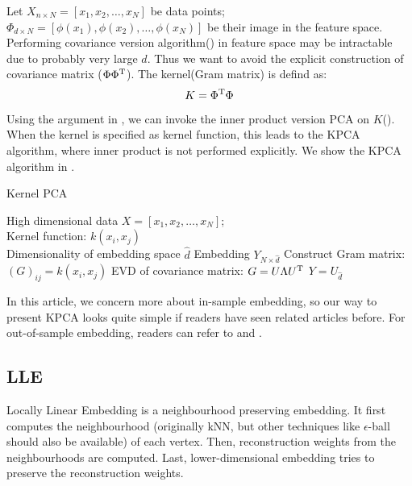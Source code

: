 Let $X_{n \times N} = [x_1, x_2, \ldots, x_N]$ be data points; 
$\Phi_{d \times N} = [\phi(x_1), \phi(x_2), \ldots, \phi(x_N)]$ be
their image in the feature space. Performing covariance 
version algorithm(\ralg{\ref{alg:pca_cov}}) in feature space 
may be intractable due to probably very large $ d $. Thus 
we want to avoid the explicit construction of covariance 
matrix ($ \Phi\Phi^\mathrm{T} $). 
The kernel(Gram matrix) is defind as:
\begin{equation}
	K = \Phi^\mathrm{T}\Phi 
\end{equation}
Using the argument in \rsec{\ref{sec:pca}}, we can 
invoke the inner product version PCA on $ K $(\ralg{\ref{alg:pca_in}}). 
When the kernel is specified as kernel function, 
this leads to the KPCA algorithm, where inner product
is not performed explicitly. We show the KPCA algorithm in 
\ralg{\ref{alg:kpac}}. 
 
\begin{algorithm}[htb]
	\caption{Kernel PCA}
	\label{alg:kpac}
	\begin{algorithmic}[1]
		\REQUIRE High dimensional data $X = [x_1, x_2, \ldots, x_N]$; \\
			Kernel function: $ k(x_i,x_j) $\\
			Dimensionality of embedding space $ \hat{d} $
		\ENSURE Embedding $ Y_{N \times \hat{d}} $
		\STATE Construct Gram matrix: $ (G)_{ij} = k(x_i,x_j)$
		\STATE EVD of covariance matrix: $ G = U \Lambda U^\mathrm{T} $
		\STATE $ Y = U_{\hat{d}} $
	\end{algorithmic}
\end{algorithm}

In this article, we concern more about in-sample embedding, so 
our way to present KPCA looks quite simple if readers have 
seen related articles before. For out-of-sample embedding, 
readers can refer to \cite{scholkopf1998kpca} and \cite{bengio2004out}. 

\subsection{LLE}
\label{sec:lle}

Locally Linear Embedding\cite{roweis2000lle} is a neighbourhood
preserving embedding. It first computes the neighbourhood
(originally kNN, but other techniques like $ \epsilon $-ball 
should also be available) of each vertex. Then, reconstruction weights
from the neighbourhoods are computed. Last, lower-dimensional embedding
tries to preserve the reconstruction weights. 

